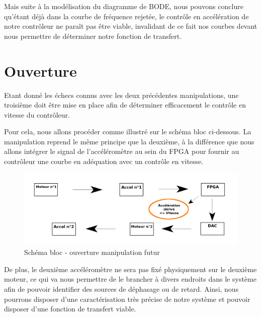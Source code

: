 \documentclass[french,a4paper,12pt]{report}
\begin{document}
			Mais suite à la modélisation du diagramme de BODE, nous pouvons conclure qu'étant déjà dans la courbe de fréquence rejetée, le contrôle en accélération de notre contrôleur ne paraît pas être viable, invalidant de ce fait nos courbes devant nous permettre de déterminer notre fonction de transfert.
			
\newpage
			
		\chapter{Ouverture}
	
		Etant donné les échecs connus avec les deux précédentes manipulations, une troisième doit être mise en place afin de déterminer efficacement le contrôle en vitesse du contrôleur.
		
		Pour cela, nous allons procéder comme illustré sur le schéma bloc ci-dessous. La manipulation reprend le même principe que la deuxième, à la différence que nous allons intégrer le signal de l'accéléromètre au sein du FPGA pour fournir au contrôleur une courbe en adéquation avec un contrôle en vitesse.
		
	\begin{figure}[!ht]
    \center
  	\includegraphics[width=18cm]{manip3.png}
    \caption{Schéma bloc - ouverture manipulation futur}
	\end{figure}
	
	De  plus, le deuxième accéléromètre ne sera pas fixé physiquement sur le deuxième moteur, ce qui va nous permettre de le brancher à divers endroits dans le système afin de pouvoir identifier des sources de déphasage ou de retard. Ainsi, nous pourrons disposer d'une caractérisation très précise de notre système et pouvoir disposer d'une fonction de transfert viable.
	
	
	
%
%
\end{document}
